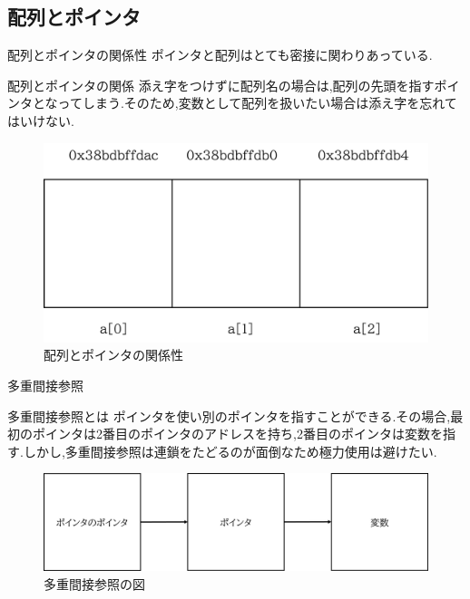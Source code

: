 \subsection{配列とポインタ}
\begin{frame}{配列とポインタの関係性} \label{配列とポインタの関係性}
ポインタと配列はとても密接に関わりあっている.
\begin{block}{配列とポインタの関係}
    添え字をつけずに配列名の場合は,配列の先頭を指すポインタとなってしまう.そのため,変数として配列を扱いたい場合は添え字を忘れてはいけない.
\end{block}
    \begin{minipage}{\linewidth}
        
    \end{minipage}

\newpage

    \begin{figure}[h]
        \centering
        \includegraphics[width=0.5\linewidth]{png/arr_p.png}
        \caption{配列とポインタの関係性}
        \label{fig:enter-label}
    \end{figure}
\end{frame}

\begin{frame}[fragile]{多重間接参照}
    \begin{block}{多重間接参照とは}
        ポインタを使い別のポインタを指すことができる.その場合,最初のポインタは2番目のポインタのアドレスを持ち,2番目のポインタは変数を指す.しかし,多重間接参照は連鎖をたどるのが面倒なため極力使用は避けたい.
    \end{block}

    \begin{figure}[h]
        \centering
        \includegraphics[width=0.5\linewidth]{png/multi.png}
        \caption{多重間接参照の図}
        \label{fig:enter-label}
    \end{figure}
\end{frame}


